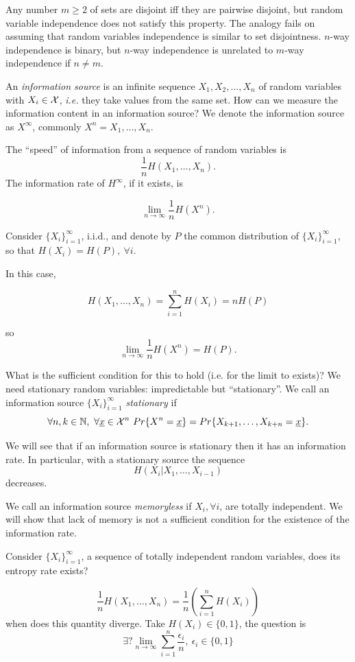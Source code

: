 Any number $m \geq 2$ of sets are disjoint iff they are pairwise disjoint, but random variable independence does not satisfy this property. The analogy fails on assuming that random variables independence is similar to set disjointness. $n$-way independence is binary, but $n$-way independence is unrelated to $m$-way independence if $n \not= m$.

An \emph{information source} is an infinite sequence $X_1, X_2, \ldots, X_n$ of random variables with $X_i \in \mathcal{X}$, \emph{i.e.} they take values from the same set. How can we measure the information content in an information source? We denote the information source as $X^\infty$, commonly $X^n = X_1, \ldots, X_n$. 

The ``speed'' of information from a sequence of random variables is $$\dfrac{1}{n}H(X_1, \ldots, X_n).$$
The information rate of $H^\infty$, if it exists, is

\[
 \lim_{n \rightarrow \infty} \dfrac{1}{n}H(X^n).
\]

Consider $\{X_i\}_{i = 1}^\infty$, i.i.d., and denote by $P$ the common distribution of $\{X_i\}_{i = 1}^\infty$, so that $H(X_i) = H(P),\ \forall i.$

In this case,

\[
 H(X_1, \ldots, X_n) = \sum_{i = 1}^n H(X_i) = nH(P)
\]

so
\[
 \lim_{n \rightarrow \infty} \dfrac{1}{n}H(X^n) = H(P).
\]

What is the sufficient condition for this to hold (i.e. for the limit to exists)? We need stationary random variables: impredictable but ``stationary''. We call an information source $\{X_i\}_{i = 1}^\infty$ \emph{stationary} if 
\[
 \forall n,k \in \mathbb{N},\ \forall \underline{x} \in \mathcal{X}^n\ Pr\{X^n=\underline{x}\} = Pr\{X_{k+1}, \ldots, X_{k+n} = \underline{x}\}.
\]

We will see that if an information source is stationary then it has an information rate. In particular, with a stationary source the sequence $$H(X_i | X_1, \ldots, X_{i-1})$$ decreases.

We call an information source \emph{memoryless} if $X_i, \forall i$, are totally independent. We will show that lack of memory is not a sufficient condition for the existence of the information rate.

Consider $\{X_i\}_{i = 1}^\infty$, a sequence of totally independent random variables, does its entropy rate exists?

\[
 \dfrac{1}{n}H(X_1, \ldots, X_n) = \dfrac{1}{n}\left(\sum_{i=1}^nH(X_i)\right)
\]
when does this quantity diverge. Take $H(X_i) \in \{0, 1\}$, the question is
\[ 
\exists? \lim_{n\rightarrow \infty} \sum_{i = 1}^n \dfrac{\epsilon_i}{n},\ \epsilon_i \in \{0, 1\}
\]


